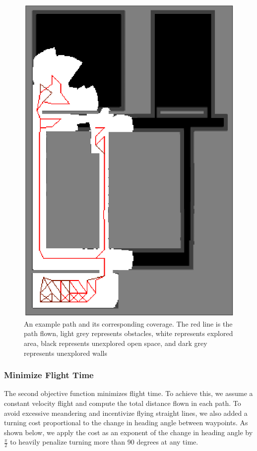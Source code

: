 \documentclass[letterpaper, 10 pt, conference]{ieeeconf}  %
\begin{document}
\begin{figure}
\centering
\includegraphics[width=0.8\linewidth]{figures/coverage_map3.png}
\caption{An example path and its corresponding coverage. The red line is the path flown, light grey represents obstacles, white represents explored area, black represents unexplored open space, and dark grey represents unexplored walls}
\label{fig:coverage}
\end{figure}

\subsubsection{Minimize Flight Time}

The second objective function minimizes flight time. To achieve this, we assume a constant velocity flight and compute the total distance flown in each path. To avoid excessive meandering and incentivize flying straight lines, we also added a turning cost proportional to the change in heading angle between waypoints. As shown below, we apply the cost as an exponent of the change in heading angle by $\frac{\pi}{2}$ to heavily penalize turning more than 90 degrees at any time.
\end{document}
